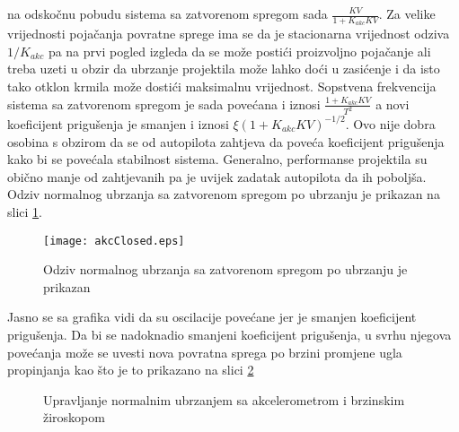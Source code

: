 na odskočnu pobudu sistema sa zatvorenom spregom sada $\frac{KV}{1+K_{akc}KV}$. 
Za velike vrijednosti pojačanja povratne sprege ima se da je stacionarna vrijednost odziva 
$1/K_{akc}$ pa na prvi pogled izgleda da se može postići proizvoljno pojačanje ali treba 
uzeti u obzir da ubrzanje projektila može lahko doći u zasićenje i da isto tako 
otklon krmila može dostići maksimalnu vrijednost. Sopstvena frekvencija sistema 
sa zatvorenom spregom je sada povećana i iznosi $\frac{1+K_{akc}KV}{T^2}$ a novi 
koeficijent prigušenja je smanjen i iznosi $\xi (1+K_{akc}KV)^{-1/2}$. Ovo nije dobra 
osobina s obzirom da se od autopilota zahtjeva da poveća koeficijent prigušenja kako bi 
se povećala stabilnost sistema. Generalno, performanse projektila su obično 
manje od zahtjevanih pa je uvijek zadatak autopilota da ih poboljša. 
Odziv normalnog ubrzanja sa zatvorenom spregom po ubrzanju je prikazan na slici \ref{fig:akcClosed}.
\begin{figure}[!ht]
    \centering
    \texttt{[image: akcClosed.eps]}
    \caption{Odziv normalnog ubrzanja sa zatvorenom spregom po ubrzanju je prikazan}
    \label{fig:akcClosed}
\end{figure}
Jasno se sa grafika vidi da su oscilacije povećane jer je smanjen koeficijent prigušenja. 
Da bi se nadoknadio smanjeni koeficijent prigušenja, u svrhu njegova povećanja može se uvesti 
nova povratna sprega po brzini promjene ugla propinjanja kao što je to prikazano na slici 
\ref{fig:nz2loop}
\begin{figure}[!ht]
    \centering 
    \caption{Upravljanje normalnim ubrzanjem sa akcelerometrom i brzinskim žiroskopom}
    \label{fig:nz2loop}
\end{figure}
